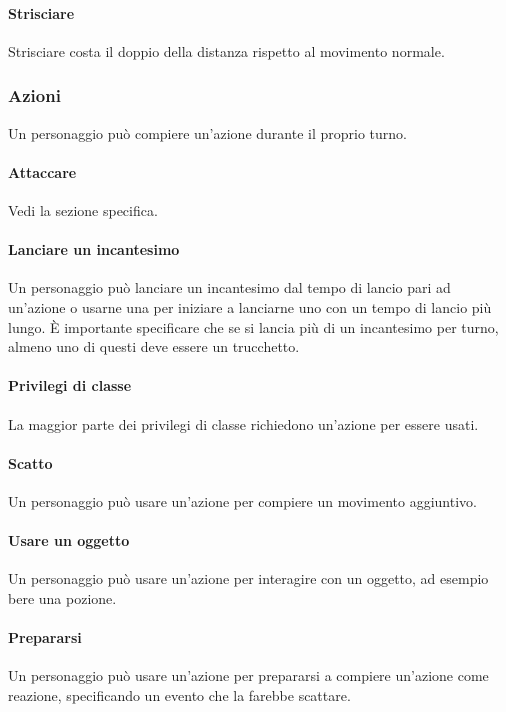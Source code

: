 \paragraph{Strisciare}
Strisciare costa il doppio della distanza rispetto al movimento normale.\\

\subsubsection{Azioni}
Un personaggio può compiere un'azione durante il proprio turno.\\
\paragraph{Attaccare} Vedi la sezione specifica.\\
\paragraph{Lanciare un incantesimo} Un personaggio può lanciare un incantesimo dal tempo di lancio pari ad un'azione o usarne una per iniziare a lanciarne uno con un tempo di lancio più lungo. È importante specificare che se si lancia più di un incantesimo per turno, almeno uno di questi deve essere un trucchetto.\\
\paragraph{Privilegi di classe}
La maggior parte dei privilegi di classe richiedono un'azione per essere usati.\\
\paragraph{Scatto}
Un personaggio può usare un'azione per compiere un movimento aggiuntivo.\\
\paragraph{Usare un oggetto}
Un personaggio può usare un'azione per interagire con un oggetto, ad esempio bere una pozione.\\
\paragraph{Prepararsi}
Un personaggio può usare un'azione per prepararsi a compiere un'azione come reazione, specificando un evento che la farebbe scattare.\\
